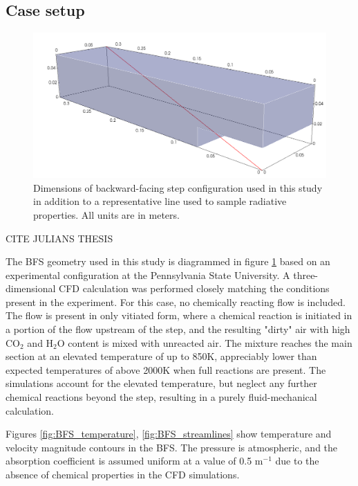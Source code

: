 \subsection{Case setup}
\begin{figure}
\includegraphics[width=\linewidth]{figures/ch4/BFS_visual.png}
\caption{Dimensions of backward-facing step configuration used in this study in addition to a representative line used to sample radiative properties. All units are in meters. }
\label{fig:BFS_geometry}
\end{figure}

CITE JULIANS THESIS

The BFS geometry used in this study is diagrammed in figure \ref{fig:BFS_geometry} based on an experimental configuration at the Pennsylvania State University.
A three-dimensional CFD calculation was performed closely matching the conditions present in the experiment. For this case, no chemically reacting flow is included. 
The flow is present in only vitiated form, where a chemical reaction is initiated in a portion of the flow upstream of the step, and the resulting "dirty" air with high CO$_2$ and H$_2$O content is mixed with unreacted air. 
The mixture reaches the main section at an elevated temperature of up to 850K, appreciably lower than expected temperatures of above 2000K when full reactions are present. 
The simulations account for the elevated temperature, but neglect any further chemical reactions beyond the step, resulting in a purely fluid-mechanical calculation.

Figures \ref{fig:BFS_temperature}, \ref{fig:BFS_streamlines} show temperature and velocity magnitude contours in the BFS. The pressure is atmospheric, and the absorption coefficient is assumed uniform at a value of 0.5 m$^{-1}$ due to the absence of chemical properties in the CFD simulations.

